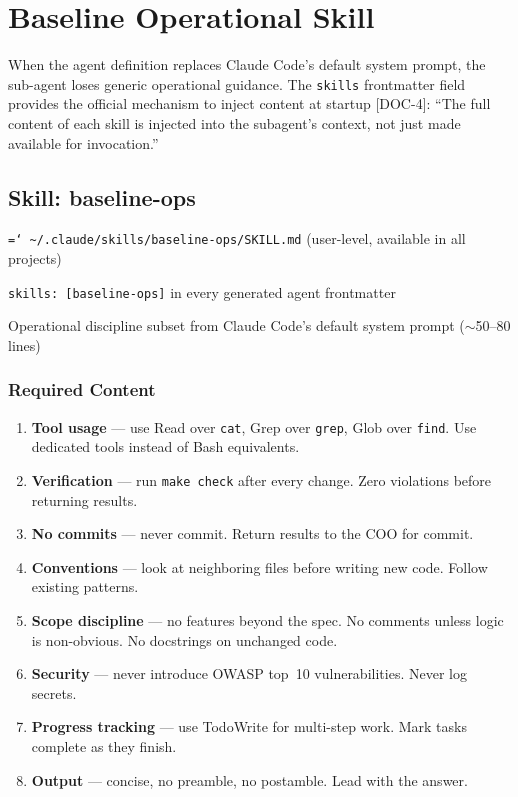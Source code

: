 \documentclass[a4paper,10pt]{article}
\newcommand{\fpath}[1]{\texttt{\hyphenchar\font=`\/ #1}}
\newcommand{\field}[1]{\texttt{#1}}
\newcommand{\cmd}[1]{\texttt{#1}}
\newcommand{\coderef}[1]{\textsf{\small [#1]}}
\begin{document}
\section{Baseline Operational Skill}
\label{sec:baseline}

When the agent definition replaces Claude Code's default system
prompt, the sub-agent loses generic operational guidance. The
\field{skills} frontmatter field provides the official mechanism to
inject content at startup \coderef{DOC-4}: ``The full content of
each skill is injected into the subagent's context, not just made
available for invocation.''

\subsection{Skill: baseline-ops}

\begin{description}[style=nextline]
  \item[Location] \fpath{\~{}/.claude/skills/baseline-ops/SKILL.md}
    (user-level, available in all projects)
  \item[Preloaded via] \field{skills: [baseline-ops]} in every
    generated agent frontmatter
  \item[Content] Operational discipline subset from Claude Code's
    default system prompt ($\sim$50--80 lines)
\end{description}

\subsubsection{Required Content}

\begin{enumerate}
  \item \textbf{Tool usage} --- use Read over \cmd{cat}, Grep over
    \cmd{grep}, Glob over \cmd{find}. Use dedicated tools instead of
    Bash equivalents.
  \item \textbf{Verification} --- run \cmd{make check} after every
    change. Zero violations before returning results.
  \item \textbf{No commits} --- never commit. Return results to the
    COO for commit.
  \item \textbf{Conventions} --- look at neighboring files before
    writing new code. Follow existing patterns.
  \item \textbf{Scope discipline} --- no features beyond the spec.
    No comments unless logic is non-obvious. No docstrings on
    unchanged code.
  \item \textbf{Security} --- never introduce OWASP top~10
    vulnerabilities. Never log secrets.
  \item \textbf{Progress tracking} --- use TodoWrite for multi-step
    work. Mark tasks complete as they finish.
  \item \textbf{Output} --- concise, no preamble, no postamble. Lead
    with the answer.
\end{enumerate}
\end{document}
